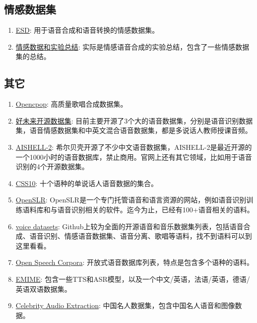 \documentclass[cn,10pt,math=newtx,citestyle=gb7714-2015,bibstyle=gb7714-2015]{elegantbook}
\begin{document}
\subsection{情感数据集}
\begin{enumerate}
  \item \href{https://github.com/HLTSingapore/Emotional-Speech-Data}{ESD}: 用于语音合成和语音转换的情感数据集。
  \item \href{https://github.com/Emotional-Text-to-Speech/dl-for-emo-tts}{情感数据和实验总结}: 实际是情感语音合成的实验总结，包含了一些情感数据集的总结。
\end{enumerate}

\subsection{其它}
\begin{enumerate}
  \item \href{https://wenet.org.cn/opencpop}{Opencpop}: 高质量歌唱合成数据集。
  \item \href{https://ai.100tal.com/dataset}{好未来开源数据集}: 目前主要开源了3个大的语音数据集，分别是语音识别数据集，语音情感数据集和中英文混合语音数据集，都是多说话人教师授课音频。
  \item \href{http://www.aishelltech.com/aishell_2}{AISHELL-2}: 希尔贝壳开源了不少中文语音数据集，AISHELL-2是最近开源的一个1000小时的语音数据库，禁止商用。官网上还有其它领域，比如用于语音识别的4个开源数据集。
  \item \href{https://github.com/Kyubyong/css10}{CSS10}: 十个语种的单说话人语音数据的集合。
  \item \href{https://www.openslr.org/resources.php}{OpenSLR}: OpenSLR是一个专门托管语音和语言资源的网站，例如语音识别训练语料库和与语音识别相关的软件。迄今为止，已经有100+语音相关的语料。
  \item \href{https://github.com/jim-schwoebel/voice_datasets}{voice datasets}: Github上较为全面的开源语音和音乐数据集列表，包括语音合成、语音识别、情感语音数据集、语音分离、歌唱等语料，找不到语料可以到这里看看。
  \item \href{https://github.com/JRMeyer/open-speech-corpora}{Open Speech Corpora}: 开放式语音数据库列表，特点是包含多个语种的语料。
  \item \href{https://www.emime.org/participate.html}{EMIME}: 包含一些TTS和ASR模型，以及一个中文/英语，法语/英语，德语/英语双语数据集。
  \item \href{https://github.com/celebrity-audio-collection/videoprocess}{Celebrity Audio Extraction}: 中国名人数据集，包含中国名人语音和图像数据。
\end{enumerate}
\end{document}
